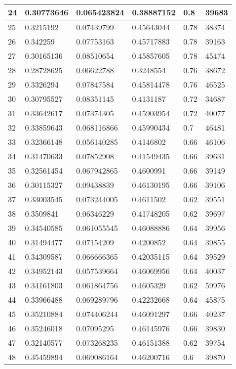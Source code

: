 \begin{longtable}{|l|l|l|l|l|l|}
24 & 0.30773646 & 0.065423824 & 0.38887152 & 0.8 & 39683 \\ \hline 
25 & 0.3215192 & 0.07439799 & 0.45643044 & 0.78 & 38374 \\ \hline 
26 & 0.342259 & 0.07753163 & 0.45717883 & 0.78 & 39163 \\ \hline 
27 & 0.30165136 & 0.08510654 & 0.45857605 & 0.78 & 45474 \\ \hline 
28 & 0.28728625 & 0.06622788 & 0.3248554 & 0.76 & 38672 \\ \hline 
29 & 0.3326294 & 0.07847584 & 0.45814478 & 0.76 & 46525 \\ \hline 
30 & 0.30795527 & 0.08351145 & 0.4131187 & 0.72 & 34687 \\ \hline 
31 & 0.33642617 & 0.07374305 & 0.45903954 & 0.72 & 40077 \\ \hline 
32 & 0.33859643 & 0.068116866 & 0.45990434 & 0.7 & 46481 \\ \hline 
33 & 0.32366148 & 0.056140285 & 0.4146802 & 0.66 & 46106 \\ \hline 
34 & 0.31470633 & 0.07852908 & 0.41549435 & 0.66 & 39631 \\ \hline 
35 & 0.32561454 & 0.067942865 & 0.4600991 & 0.66 & 39149 \\ \hline 
36 & 0.30115327 & 0.09438839 & 0.46130195 & 0.66 & 39106 \\ \hline 
37 & 0.33003545 & 0.073244005 & 0.4611502 & 0.62 & 39551 \\ \hline 
38 & 0.3509841 & 0.06346229 & 0.41748205 & 0.62 & 39697 \\ \hline 
39 & 0.34540585 & 0.061055545 & 0.46088886 & 0.64 & 39956 \\ \hline 
40 & 0.31494477 & 0.07154209 & 0.4200852 & 0.64 & 39855 \\ \hline 
41 & 0.34309587 & 0.066666365 & 0.42035115 & 0.64 & 39529 \\ \hline 
42 & 0.34952143 & 0.057539664 & 0.46069956 & 0.64 & 40037 \\ \hline 
43 & 0.34161803 & 0.061864756 & 0.4605329 & 0.62 & 59976 \\ \hline 
44 & 0.33966488 & 0.069289796 & 0.42232668 & 0.64 & 45875 \\ \hline 
45 & 0.35210884 & 0.074406244 & 0.46091297 & 0.66 & 40237 \\ \hline 
46 & 0.35246018 & 0.07095295 & 0.46145976 & 0.66 & 39830 \\ \hline 
47 & 0.32140577 & 0.073268235 & 0.46151388 & 0.62 & 39754 \\ \hline 
48 & 0.35459894 & 0.069086164 & 0.46200716 & 0.6 & 39870 \\ \hline 

\end{longtable}

